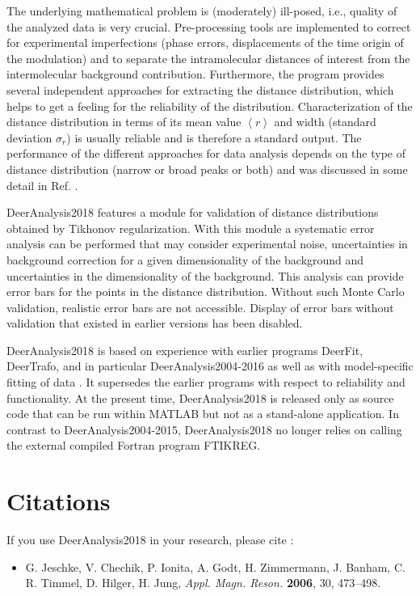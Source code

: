 \documentclass{article}
\begin{document}
The underlying mathematical problem is (moderately) ill-posed, i.e., quality of the analyzed data is very crucial. Pre-processing tools are implemented to correct for experimental imperfections (phase errors, displacements of the time origin of the modulation) and to separate the intramolecular distances of interest from the intermolecular background contribution. Furthermore, the program provides several independent approaches for extracting the distance distribution, which helps to get a feeling for the reliability of the distribution. Characterization of the distance distribution in terms of its mean value $\left\langle r \right\rangle$ and width (standard deviation $\sigma_{r}$) is usually reliable \cite{jeschke2004a} and is therefore a standard output. The performance of the different approaches for data analysis depends on the type of distance distribution (narrow or broad peaks or both) and was discussed in some detail in Ref. \cite{jeschke2004a}.

DeerAnalysis2018 features a module for validation of distance distributions obtained by Tikhonov regularization. With this module a systematic error analysis can be performed that may consider experimental noise, uncertainties in background correction for a given dimensionality of the background and uncertainties in the dimensionality of the background. This analysis can provide error bars for the points in the distance distribution. Without such Monte Carlo validation, realistic error bars are not accessible. Display of error bars without validation that existed in earlier versions has been disabled.

DeerAnalysis2018 is based on experience with earlier programs DeerFit, DeerTrafo, and in particular DeerAnalysis2004-2016 as well as with model-specific fitting of data \cite{jeschke2003b,hinderbe2004,godt2006}. It supersedes the earlier programs with respect to reliability and functionality. At the present time, DeerAnalysis2018 is released only as source code that can be run within MATLAB but not as a stand-alone application. In contrast to DeerAnalysis2004-2015, DeerAnalysis2018 no longer relies on calling the external compiled Fortran program FTIKREG.

\section{Citations}

If you use DeerAnalysis2018 in your research, please cite \cite{jeschke2006}:
\begin{itemize}
\item G. Jeschke, V. Chechik, P. Ionita, A. Godt, H. Zimmermann, J. Banham, C. R. Timmel, D. Hilger, H. Jung, \emph{Appl. Magn. Reson.} {\bf 2006}, 30, 473--498.
\end{itemize}
\end{document}

